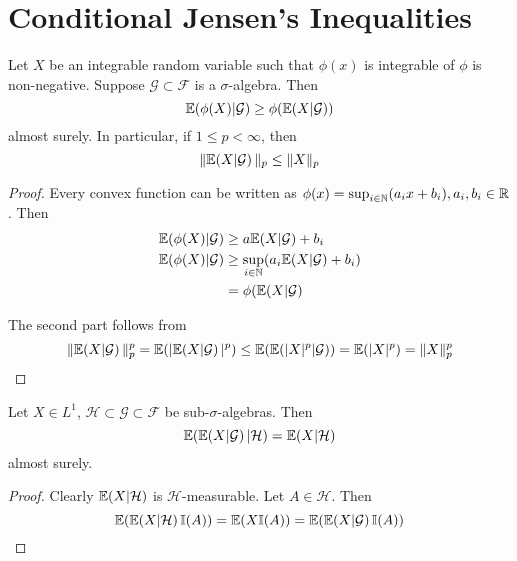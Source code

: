 \section{Conditional Jensen's Inequalities}
\label{sec:cond-jens-ineq}

Let $X$ be an integrable random variable such that $\phi(x)$ is
integrable of $\phi $ is non-negative. Suppose $\mathcal{G} \subset
\mathcal{F}$ is a $\sigma$-algebra. Then
\begin{equation}
  \label{eq:8}
  \E{\phi(X)|\mathcal{G}} \geq \phi(\E{X|\mathcal{G}})
\end{equation} almost surely.  In particular, if $1 \leq p < \infty$,
then
\begin{equation}
  \label{eq:9}
  \| \E{X | \mathcal{G}} \|_{p} \leq \| X \|_{p}
\end{equation}

\begin{proof}
  Every convex function can be written as $\phi(x) = \sup_{i \in
    \mathbb{N}}(a_{i} x + b_{i}), a_{i}, b_{i} \in \mathbb{R}$.  Then
  \begin{align*}
    \E{\phi(X) | \mathcal{G}} & \geq a \E{X | \mathcal{G}} + b_{i} \\
    \E{\phi(X) | \mathcal{G}} & \geq \sup_{i \in \N} (a_{i} \E{X |
      \mathcal{G}} + b_{i})                                        \\
                              & = \phi(\E{X | \mathcal{G}}
  \end{align*}

  The second part follows from
  \begin{equation}
    \label{eq:10}
    \| \E{X | \mathcal{G}} \|_{p}^{p} = \E{|\E{X | \mathcal{G}}|^{p}}
    \leq \E{\E{|X|^{p} | \mathcal{G}}} = \E{|X|^{p}} = \|X\|_{p}^{p}
  \end{equation}
\end{proof}

\begin{proposition}
  Let $X \in L^{1}$, $\mathcal{H} \subset \mathcal{G} \subset
  \mathcal{F}$ be sub-$\sigma$-algebras.  Then
  \begin{equation}
    \label{eq:11}
    \E{\E{X | \mathcal{G}} | \mathcal{H}} = \E{X | \mathcal{H}}
  \end{equation} almost surely.
\end{proposition}

\begin{proof}
  Clearly $\E{X | \mathcal{H}}$ is $\mathcal{H}$-measurable.  Let $A
  \in \mathcal{H}$.  Then
  \begin{equation}
    \label{eq:12}
    \E{\E{X | \mathcal{H}} \I{A}} = \E{X \I{A}} = \E{\E{X |
        \mathcal{G}} \I{A}}
  \end{equation}
\end{proof}

